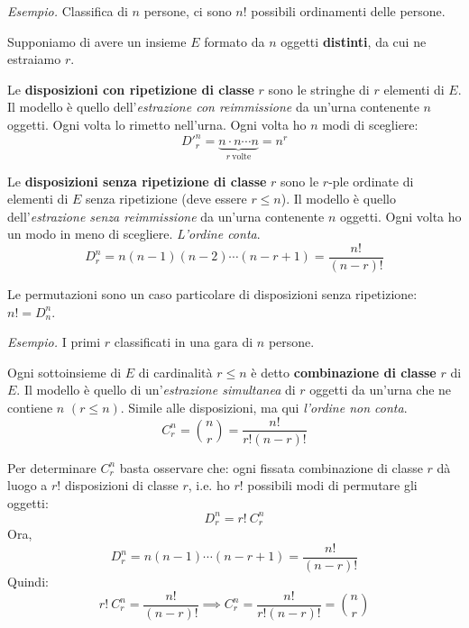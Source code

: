 \textit{Esempio.} Classifica di $n$ persone, ci sono $n!$ possibili ordinamenti delle persone.

Supponiamo di avere un insieme $E$ formato da $n$ oggetti \textbf{distinti}, da cui ne estraiamo $r$.
\begin{definition}
	Le \textbf{disposizioni con ripetizione di classe }$r$ sono le stringhe di $r$ elementi di $E$. Il modello è quello dell'\textit{estrazione con reimmissione} da un'urna contenente $n$ oggetti. Ogni volta lo rimetto nell'urna. Ogni volta ho $n$ modi di scegliere:
	\begin{equation*}
		\boxed{D'^{n}_{r} =\underbrace{n\cdot n\cdots n}_{r\ \text{volte}} =n^{r}}
	\end{equation*}
\end{definition}

\begin{definition}
	Le \textbf{disposizioni senza ripetizione di classe} $r$ sono le $r$-ple ordinate di elementi di $E$ senza ripetizione (deve essere $r\leq n$). Il modello è quello dell'\textit{estrazione senza reimmissione} da un'urna contenente $n$ oggetti. Ogni volta ho un modo in meno di scegliere. \textit{L'ordine conta}.
	\begin{equation*}
		\boxed{D_{r}^{n} =n(n-1)(n-2) \cdots (n-r+1) =\frac{n!}{(n-r) !}}
	\end{equation*}
\end{definition}

\begin{oss}
	Le permutazioni sono un caso particolare di disposizioni senza ripetizione: $n!=D_{n}^{n}$.
\end{oss}

\textit{Esempio.} I primi $r$ classificati in una gara di $n$ persone.

\begin{definition}
	Ogni sottoinsieme di $E$ di cardinalità $r\leq n$ è detto \textbf{combinazione di classe} $r$ di $E$. Il modello è quello di un'\textit{estrazione simultanea} di $r$ oggetti da un'urna che ne contiene $n$ $(r\leq n)$. Simile alle disposizioni, ma qui \textit{l'ordine non conta}.
	\begin{equation*}
		\boxed{C_{r}^{n} =\binom{n}{r} =\frac{n!}{r!(n-r) !}}
	\end{equation*}
\end{definition}

\begin{oss}
Per determinare $C_{r}^{n}$ basta osservare che: ogni fissata combinazione di classe $r$ dà luogo a $r!$ disposizioni di classe $r$, i.e. ho $r!$ possibili modi di permutare gli oggetti:
	\begin{equation*}
		D_{r}^{n} =r!\ C_{r}^{n}
	\end{equation*}
	Ora,
	\begin{equation*}
		D_{r}^{n} =n(n-1) \cdots (n-r+1) =\frac{n!}{(n-r) !}
	\end{equation*}
	Quindi:
	\begin{equation*}
		r!\ C_{r}^{n} =\frac{n!}{(n-r) !} \implies C_{r}^{n} =\frac{n!}{r!(n-r) !} =\binom{n}{r}
	\end{equation*}
\end{oss}

